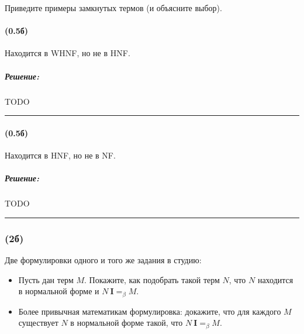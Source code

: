 \documentclass{article}
\newenvironment{proof}{\subparagraph{\hspace{-1em}Решение:\newline}}{\par\noindent\rule{\textwidth}{0.4pt}}
\newcommand{\comb}[1]{\mathbf{#1}}
\newcommand{\eqbeta}{=_\beta}
\begin{document}
    Приведите примеры замкнутых термов (и объясните выбор).

    \paragraph{(0.5б)}

    Находится в WHNF, но не в HNF.

    \begin{proof}
        TODO %
    \end{proof}

    \paragraph{(0.5б)}

    Находится в HNF, но не в NF.

    \begin{proof}
        TODO %
    \end{proof}

    \subsubsection{(2б)}

    Две формулировки одного и того же задания в студию:
    \begin{itemize}
        \item Пусть дан терм $M$.
        Покажите, как подобрать такой терм $N$, что $N$ находится в нормальной форме и $N~\comb{I} =_\beta M$.
        \item Более привычная математикам формулировка: докажите, что для каждого $M$ существует $N$ в нормальной форме такой, что $N~\comb{I} \eqbeta M$.
    \end{itemize}
\end{document}
